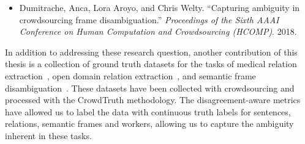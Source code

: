 \begin{itemize}
    \begin{itemize}
        \item Dumitrache, Anca, Lora Aroyo, and Chris Welty. ``Capturing ambiguity in crowdsourcing frame disambiguation.'' \textit{Proceedings of the Sixth AAAI Conference on Human Computation and Crowdsourcing (HCOMP)}. 2018.~\cite{DBLP:conf/hcomp/DumitracheAW18}
    \end{itemize}
\end{itemize}

In addition to addressing these research question, another contribution of this thesis is a collection of ground truth datasets for the tasks of medical relation extraction~\cite{anca_dumitrache_2016_50676}, open domain relation extraction~\cite{crowdODrelexdata2016}, and semantic frame disambiguation~\cite{anca_dumitrache_2018_1472345}. These datasets have been collected with crowdsourcing and processed with the CrowdTruth methodology. The disagreement-aware metrics have allowed us to label the data with continuous truth labels for sentences, relations, semantic frames and workers, allowing us to capture the ambiguity inherent in these tasks.








    
